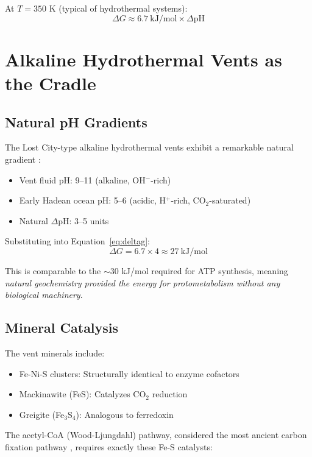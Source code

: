 \documentclass[11pt,twocolumn]{article}
\begin{document}
At $T = 350$ K (typical of hydrothermal systems):
\begin{equation}
\Delta G \approx 6.7\ \text{kJ/mol} \times \Delta\text{pH}
\end{equation}

\section{Alkaline Hydrothermal Vents as the Cradle}

\subsection{Natural pH Gradients}

The Lost City-type alkaline hydrothermal vents exhibit a remarkable natural gradient \citep{Kelley2005}:

\begin{itemize}
\item Vent fluid pH: 9--11 (alkaline, OH$^{-}$-rich)
\item Early Hadean ocean pH: 5--6 (acidic, H$^{+}$-rich, CO$_2$-saturated)
\item Natural $\Delta$pH: 3--5 units
\end{itemize}

Substituting into Equation~\ref{eq:deltag}:
\begin{equation}
\Delta G = 6.7 \times 4 \approx 27\ \text{kJ/mol}
\end{equation}

This is comparable to the $\sim$30 kJ/mol required for ATP synthesis, meaning \textit{natural geochemistry provided the energy for protometabolism without any biological machinery}.

\subsection{Mineral Catalysis}

The vent minerals include:
\begin{itemize}
\item Fe-Ni-S clusters: Structurally identical to enzyme cofactors
\item Mackinawite (FeS): Catalyzes CO$_2$ reduction
\item Greigite (Fe$_3$S$_4$): Analogous to ferredoxin
\end{itemize}

The acetyl-CoA (Wood-Ljungdahl) pathway, considered the most ancient carbon fixation pathway \citep{Weiss2016}, requires exactly these Fe-S catalysts:
\end{document}
